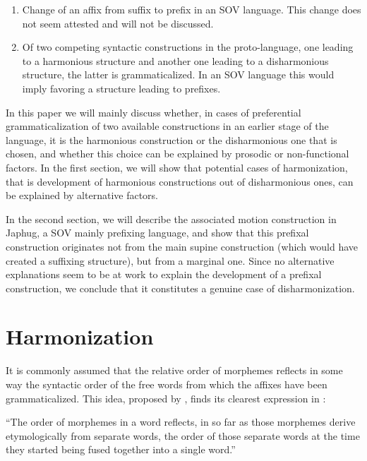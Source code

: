 \documentclass[oldfontcommands,twoside,a4paper,12pt]{article}
\begin{document}
\begin{enumerate}
\item Change of an affix from suffix to prefix in an SOV language. This change does not seem attested and will not be discussed.

\item Of two competing syntactic constructions in the proto-language, one leading to a harmonious structure and another one leading to a disharmonious structure, the latter is grammaticalized. In an SOV language this would imply favoring a structure leading to prefixes.
\end{enumerate}

In this paper we will mainly discuss whether, in cases of preferential grammaticalization of two available constructions in an earlier stage of the language, it is the harmonious construction or the disharmonious one that is chosen, and whether this choice can be explained by prosodic or non-functional factors. In the first section, we will show that potential cases of harmonization, that is development of harmonious constructions out of disharmonious ones, can be explained by alternative factors.

In the second section, we will describe the associated motion construction in Japhug, a SOV mainly prefixing language, and show that this prefixal construction originates not from the main supine construction (which would have created a suffixing structure), but from a marginal one. Since no alternative explanations seem to be at work to explain the development of a prefixal construction, we conclude that it constitutes a genuine case of disharmonization.





\section{Harmonization} \label{sec:pref>suf}

 
It is commonly assumed that the relative order of morphemes reflects in some way the syntactic order of the free words from which the affixes have been grammaticalized. This idea, proposed by \citet{givon71archeo}, finds its clearest expression in \citet[84]{comrie80morpho}:
 
 ``The order of morphemes in a word reflects, in so far as those morphemes derive etymologically from separate words,  the order of those separate words at the time they started being fused together into a single word.''
 
\end{document}
